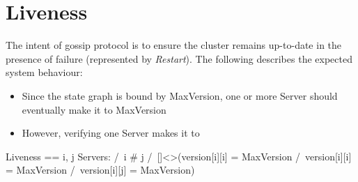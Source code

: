 \section{Liveness}

The intent of gossip protocol is to ensure the cluster remains up-to-date in the
presence of failure (represented by \textit{Restart}). The following describes 
the expected system behaviour:
\begin{itemize}
    \item Since the state graph is bound by MaxVersion, one or more Server
    should eventually make it to MaxVersion
    \item However, verifying one Server makes it to 
\end{itemize}

\begin{tla}
Liveness == 
    \E i, j \in Servers: 
        /\ i # j
        /\ []<>(version[i][i] = MaxVersion /\ version[i][i] = MaxVersion /\ version[i][j] = MaxVersion)
\end{tla}
\begin{tlatex}
%
%
%
\end{tlatex}

% 
